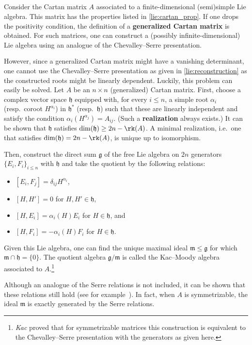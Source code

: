 \subsection{}

    \begin{construct}\label{lie:kac_moody}
        Consider the Cartan matrix $A$ associated to a finite-dimensional (semi)simple Lie algebra. This matrix has the properties listed in \cref{lie:cartan_prop}. If one drops the positivity condition, the definition of a \textbf{generalized Cartan matrix} is obtained. For such matrices, one can construct a (possibly infinite-dimensional) Lie algebra using an analogue of the Chevalley--Serre presentation.

        However, since a generalized Cartan matrix might have a vanishing determinant, one cannot use the Chevalley--Serre presentation as given in \cref{lie:reconstruction} as the constructed roots might be linearly dependent. Luckily, this problem can easily be solved. Let $A$ be an $n\times n$ (generalized) Cartan matrix. First, choose a complex vector space $\mathfrak{h}$ equipped with, for every $i\leq n$, a simple root $\alpha_i$ (resp.~coroot $H^{\alpha_i}$) in $\mathfrak{h}^*$ (resp.~$\mathfrak{h}$) such that these are linearly independent and satisfy the condition $\alpha_i(H^{\alpha_j})=A_{ij}$. (Such a \textbf{realization} always exists.) It can be shown that $\mathfrak{h}$ satisfies $\dim(\mathfrak{h})\geq2n-\rk(A)$. A minimal realization, i.e.~one that satisfies $\dim(\mathfrak{h})=2n-\rk(A)$, is unique up to isomorphism.

        Then, construct the direct sum $\mathfrak{g}$ of the free Lie algebra on $2n$ generators $\{E_i,F_i\}_{i\leq n}$ with $\mathfrak{h}$ and take the quotient by the following relations:
        \begin{itemize}
            \item $[E_i,F_j] = \delta_{ij}H^{\alpha_i}$,
            \item $[H,H']=0$ for $H,H'\in\mathfrak{h}$,
            \item $[H,E_i]=\alpha_i(H)E_i$ for $H\in\mathfrak{h}$, and
            \item $[H,F_i]=-\alpha_i(H)F_i$ for $H\in\mathfrak{h}$.
        \end{itemize}
        Given this Lie algebra, one can find the unique maximal ideal $\mathfrak{m}\leq\mathfrak{g}$ for which $\mathfrak{m}\cap\mathfrak{h}=\{0\}$. The quotient algebra $\mathfrak{g}/\mathfrak{m}$ is called the Kac--Moody algebra associated to $A$.\footnote{\textit{Kac} proved that for symmetrizable matrices this construction is equivalent to the Chevalley--Serre presentation with the generators as given here.}

        Although an analogue of the Serre relations is not included, it can be shown that these relations still hold (see for example~\citet{amini_infinite-dimensional_2014}). In fact, when $A$ is symmetrizable, the ideal $\mathfrak{m}$ is exactly generated by the Serre relations.
    \end{construct}
